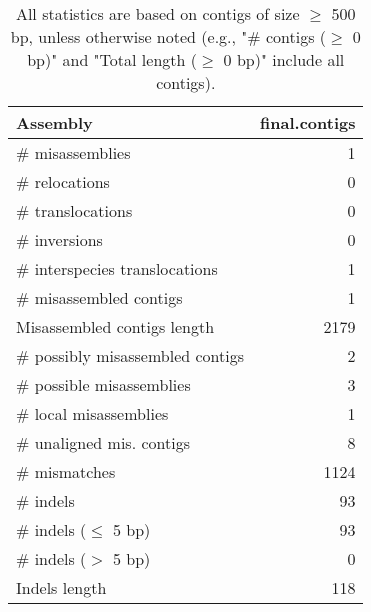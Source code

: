 \documentclass[12pt,a4paper]{article}
\begin{document}
\begin{table}[ht]
\begin{center}
\caption{All statistics are based on contigs of size $\geq$ 500 bp, unless otherwise noted (e.g., "\# contigs ($\geq$ 0 bp)" and "Total length ($\geq$ 0 bp)" include all contigs).}
\begin{tabular}{|l*{1}{|r}|}
\hline
Assembly & final.contigs \\ \hline
\# misassemblies & 1 \\ \hline
\hspace{5mm}\# relocations & 0 \\ \hline
\hspace{5mm}\# translocations & 0 \\ \hline
\hspace{5mm}\# inversions & 0 \\ \hline
\hspace{5mm}\# interspecies translocations & 1 \\ \hline
\# misassembled contigs & 1 \\ \hline
Misassembled contigs length & 2179 \\ \hline
\# possibly misassembled contigs & 2 \\ \hline
\hspace{5mm}\# possible misassemblies & 3 \\ \hline
\# local misassemblies & 1 \\ \hline
\# unaligned mis. contigs & 8 \\ \hline
\# mismatches & 1124 \\ \hline
\# indels & 93 \\ \hline
\hspace{5mm}\# indels ($\leq$ 5 bp) & 93 \\ \hline
\hspace{5mm}\# indels ($>$ 5 bp) & 0 \\ \hline
Indels length & 118 \\ \hline
\end{tabular}
\end{center}
\end{table}
\end{document}
